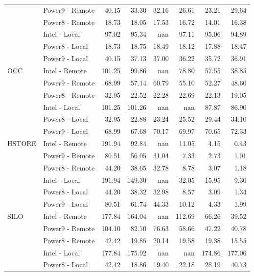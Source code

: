 \begin{tabular}{llrrrrrr}
       & Power9 - Remote &  40.15 &  33.30 &  32.16 &  26.61 &  23.21 &  29.64 \\
       & Power8 - Remote &  18.73 &  18.05 &  17.53 &  16.72 &  14.01 &  16.38 \\
       & Intel - Local &  97.02 &  95.34 &    nan &  97.11 &  95.06 &  94.89 \\
       & Power8 - Local &  18.73 &  18.75 &  18.49 &  18.12 &  17.88 &  18.47 \\
       & Power9 - Local &  40.15 &  37.13 &  37.00 &  36.22 &  35.72 &  36.91 \\
OCC & Intel - Remote & 101.25 &  99.86 &    nan &  78.80 &  57.55 &  38.85 \\
       & Power9 - Remote &  68.99 &  57.14 &  60.79 &  55.10 &  52.27 &  48.60 \\
       & Power8 - Remote &  32.95 &  22.52 &  22.28 &  22.69 &  22.13 &  19.05 \\
       & Intel - Local & 101.25 & 101.26 &    nan &    nan &  87.87 &  86.90 \\
       & Power8 - Local &  32.95 &  22.88 &  23.24 &  25.52 &  29.44 &  34.10 \\
       & Power9 - Local &  68.99 &  67.68 &  70.17 &  69.97 &  70.65 &  72.33 \\
HSTORE & Intel - Remote & 191.94 &  92.84 &    nan &  11.05 &   4.15 &   0.43 \\
       & Power9 - Remote &  80.51 &  56.05 &  31.04 &   7.33 &   2.73 &   1.01 \\
       & Power8 - Remote &  44.20 &  38.65 &  32.78 &   8.78 &   3.07 &   1.18 \\
       & Intel - Local & 191.94 & 149.30 &    nan &  32.05 &  15.95 &   9.30 \\
       & Power8 - Local &  44.20 &  38.32 &  32.98 &   8.57 &   3.09 &   1.34 \\
       & Power9 - Local &  80.51 &  61.74 &  44.33 &  10.12 &   4.33 &   1.99 \\
SILO & Intel - Remote & 177.84 & 164.04 &    nan & 112.69 &  66.26 &  39.52 \\
       & Power9 - Remote & 104.10 &  82.70 &  76.63 &  58.66 &  47.22 &  40.78 \\
       & Power8 - Remote &  42.42 &  19.85 &  20.14 &  19.58 &  19.38 &  15.55 \\
       & Intel - Local & 177.84 & 175.92 &    nan &    nan & 174.86 & 177.06 \\
       & Power8 - Local &  42.42 &  18.86 &  19.40 &  22.18 &  28.19 &  40.73 \\

\end{tabular}
